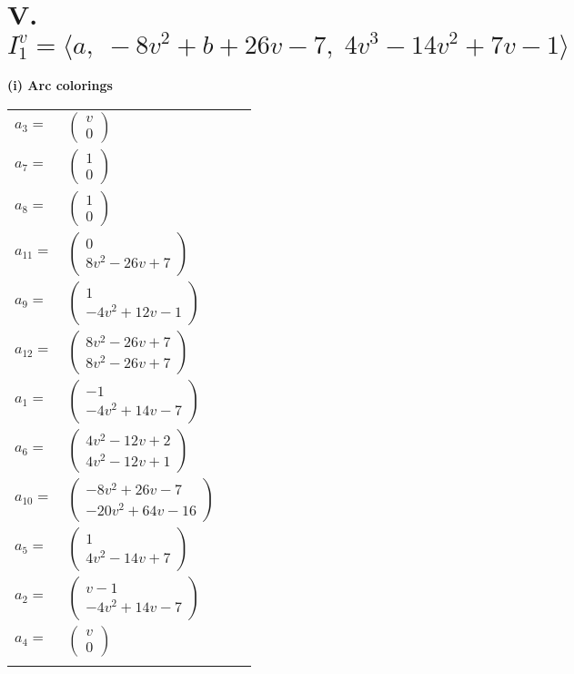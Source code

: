 \documentclass[1p]{elsarticle_modified}
\theoremstyle{definition}
\begin{document}
\centering \section*{V. $I^v_{1}= \langle a,\;-8 v^2+b+26 v-7,\;4 v^3-14 v^2+7 v-1 \rangle$}
\flushleft \textbf{(i) Arc colorings}\\
\begin{tabular}{m{7pt} m{180pt} m{7pt} m{180pt} }
\flushright $a_{3}=$&$\begin{pmatrix}v\\0\end{pmatrix}$ \\
\flushright $a_{7}=$&$\begin{pmatrix}1\\0\end{pmatrix}$ \\
\flushright $a_{8}=$&$\begin{pmatrix}1\\0\end{pmatrix}$ \\
\flushright $a_{11}=$&$\begin{pmatrix}0\\8 v^2-26 v+7\end{pmatrix}$ \\
\flushright $a_{9}=$&$\begin{pmatrix}1\\-4 v^2+12 v-1\end{pmatrix}$ \\
\flushright $a_{12}=$&$\begin{pmatrix}8 v^2-26 v+7\\8 v^2-26 v+7\end{pmatrix}$ \\
\flushright $a_{1}=$&$\begin{pmatrix}-1\\-4 v^2+14 v-7\end{pmatrix}$ \\
\flushright $a_{6}=$&$\begin{pmatrix}4 v^2-12 v+2\\4 v^2-12 v+1\end{pmatrix}$ \\
\flushright $a_{10}=$&$\begin{pmatrix}-8 v^2+26 v-7\\-20 v^2+64 v-16\end{pmatrix}$ \\
\flushright $a_{5}=$&$\begin{pmatrix}1\\4 v^2-14 v+7\end{pmatrix}$ \\
\flushright $a_{2}=$&$\begin{pmatrix}v-1\\-4 v^2+14 v-7\end{pmatrix}$ \\
\flushright $a_{4}=$&$\begin{pmatrix}v\\0\end{pmatrix}$\\&\end{tabular}
\end{document}
